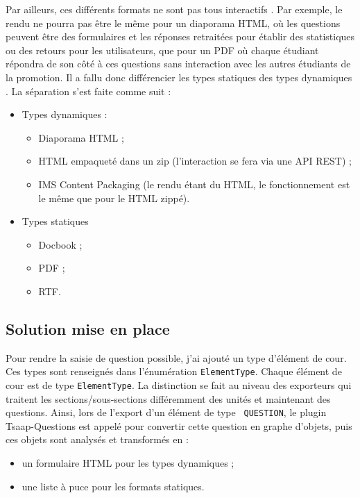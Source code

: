 Par ailleurs, ces différents formats ne sont pas tous \og interactifs \fg{}. Par
exemple, le rendu ne pourra pas être le même pour un diaporama HTML, où les
questions peuvent être des formulaires et les réponses retraitées pour établir
des statistiques ou des retours pour les utilisateurs, que pour un PDF où chaque
étudiant répondra de son côté à ces questions sans interaction avec les autres
étudiants de la promotion. Il a fallu donc différencier les types \og statiques
\fg{} des types \og dynamiques \fg{}. La séparation s'est faite comme suit :
\begin{itemize}
  \item Types dynamiques :
	\begin{itemize}
	  \item Diaporama HTML ;
	  \item HTML empaqueté dans un zip (l'interaction se fera via une API REST) ;
	  \item IMS Content Packaging (le rendu étant du HTML, le fonctionnement est
		le même que pour le HTML zippé).
	\end{itemize}
  \item Types statiques 
	\begin{itemize}
	  \item Docbook ;
	  \item PDF ;
	  \item RTF.
	\end{itemize}
\end{itemize}

\subsection{Solution mise en place}
Pour rendre la saisie de question possible, j'ai ajouté un type d'élément de
cour. Ces types sont renseignés dans l'énumération {\tt ElementType}. Chaque
élément de cour est de type {\tt ElementType}. La distinction se fait au niveau
des exporteurs qui traitent les sections/sous-sections différemment des unités
et maintenant des questions. Ainsi, lors de l'export d'un élément de type {\tt
QUESTION}, le plugin Tsaap-Questions est appelé pour convertir cette question
en graphe d'objets, puis ces objets sont analysés et transformés en :
\begin{itemize}
  \item un formulaire HTML pour les types dynamiques ;
  \item une liste à puce pour les formats statiques.
\end{itemize}



